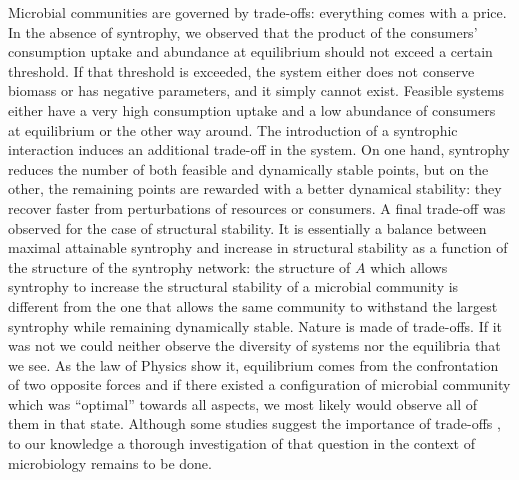 \documentclass[12pt, titlepage]{report}
\begin{document}
Microbial communities are governed by trade-offs: everything comes with a price.
In the absence of syntrophy, we observed that the product of the consumers' consumption uptake and abundance at equilibrium should not exceed a certain threshold. If that threshold is exceeded, the system either does not conserve biomass or has negative parameters, and it simply cannot exist. Feasible systems either have a very high consumption uptake and a low abundance of consumers at equilibrium or the other way around. The introduction of a syntrophic interaction induces an additional trade-off in the system. On one hand, syntrophy reduces the number of both feasible and dynamically stable points, but on the other, the remaining points are rewarded with a better dynamical stability: they recover faster from perturbations of resources or consumers. A final trade-off was observed for the case of structural stability. It is essentially a balance between maximal attainable syntrophy and increase in structural stability as a function of the structure of the syntrophy network: the structure of $A$ which allows syntrophy to increase the structural stability of a microbial community is different from the one that allows the same community to withstand the largest syntrophy while remaining dynamically stable. Nature is made of trade-offs. If it was not we could neither observe the diversity of systems nor the equilibria that we see. As the law of Physics show it, equilibrium comes from the confrontation of two opposite forces and if there existed a configuration of microbial community which was ``optimal'' towards all aspects, we most likely would observe all of them in that state. Although some studies suggest the importance of trade-offs \cite{pfeiffer_evolutionary_2002, lawrence_species_2012}, to our knowledge a thorough investigation of that question in the context of microbiology remains to be done.
\end{document}
